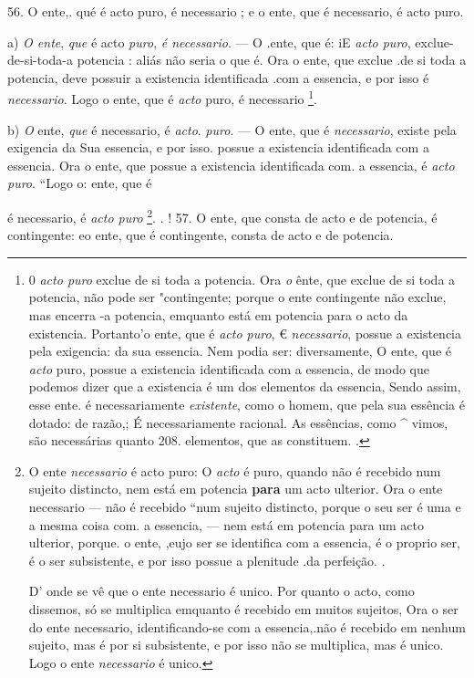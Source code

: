  56. O ente,. qué é acto puro, é necessario ; e o ente, que é necessario, é acto puro.

a) \emph{O ente}, \emph{que} é acto \emph{puro}, \emph{é necessario}. --- O .ente, que é: iE \emph{acto puro}, exclue-de-si-toda-a potencia : aliás não seria o que é. Ora o ente, que exclue .de si toda a potencia, deve possuir a existencia identificada .com a essencia, e por isso é \emph{necessario}. Logo o ente, que é \emph{acto} puro, é necessario \footnote{0 \emph{acto puro} exclue de si toda a potencia. Ora \emph{o} ênte, que exclue de si toda a potencia, não pode ser "contingente; porque o ente contingente não exclue, mas encerra -a potencia, emquanto está em potencia para o acto da existencia. Portanto'o ente, que é \emph{acto puro}, € \emph{necessario}, possue a existencia pela exigencia: da sua essencia. Nem podia ser: diversamente, O ente, que é \emph{acto} puro, possue a existencia identificada com a essencia, de modo que podemos dizer que a existencia é um dos elementos da essencia, Sendo assim, esse ente. é necessariamente \emph{existente}, como o homem, que pela sua essência é dotado: de razão,; É necessariamente racional. As essências, como \textasciicircum{} vimos, são necessárias quanto 208. elementos, que as constituem. .}.

b) \emph{O} ente, \emph{que} é necessario, é \emph{acto}. \emph{puro}. --- O ente, que é \emph{necessario}, existe pela exigencia da Sua essencia, e por isso. possue a existencia identificada com a essencia. Ora o ente, que possue a existencia identificada com. a essencia, é \emph{acto puro}. “Logo o: ente, que é

é necessario, é \emph{acto puro} \footnote{O ente \emph{necessario} é acto puro: O \emph{acto} é puro, quando não é recebido num sujeito distincto, nem está em potencia \textbf{para} um acto ulterior. Ora o ente necessario --- não é recebido “num sujeito distincto, porque o seu ser é uma e a mesma coisa com. a essencia, --- nem está em potencia para um acto ulterior, porque. o ente, ,eujo ser se identifica com a essencia, é o proprio ser, é o ser subsistente, e por isso possue a plenitude .da perfeição. .\par D' onde se vê que o ente necessario é unico. Por quanto o acto, como dissemos, só se multiplica emquanto é recebido em muitos sujeitos, Ora o ser do ente necessario, identificando-se com a essencia,.não é recebido em nenhum sujeito, mas é por si subsistente, e por isso não se multiplica, mas é unico. Logo o ente \emph{necessario} é unico.}. . ! 57. O ente, que consta de acto e de potencia, é contingente: eo ente, que é contingente, consta de acto e de potencia.

